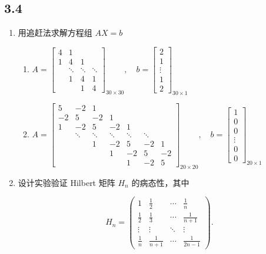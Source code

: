 \subsection*{3.4}
\begin{enumerate}
    \item 用追赶法求解方程组 $AX = b$
    \begin{enumerate}
        \item $A = \begin{bmatrix}
4 & 1 \\
1 & 4 & 1 \\
&\ddots & \ddots & \ddots \\
&1 & 4 & 1 \\
& &1 & 4 
\end{bmatrix}_{30 \times 30}, \quad 
b = \begin{bmatrix}
2 \\
1 \\
\vdots \\
1 \\
2
\end{bmatrix}_{30 \times 1}$
        \item $A = \begin{bmatrix} 5 & -2 & 1 \\ -2 & 5 & -2 & 1 \\ 1 & -2 & 5 & -2 & 1 \\
& \ddots & \ddots & \ddots & \ddots & \ddots \\
& &1 & -2 & 5 & -2 & 1 \\
& & &1 & -2 & 5 & -2 \\
&&&&1 &-2 &5
\end{bmatrix}_{20 \times 20}, \quad b = \begin{bmatrix} 1 \\ 0 \\ 0 \\ \vdots \\ 0 \\ 0 \end{bmatrix}_{20 \times 1}$
    \end{enumerate}
    \item 设计实验验证 Hilbert 矩阵 $H_n$ 的病态性，其中

\[ H_n = \begin{pmatrix}
1 & \frac{1}{2} & \cdots & \frac{1}{n} \\
\frac{1}{2} & \frac{1}{3} & \cdots & \frac{1}{n+1} \\
\vdots & \vdots & \ddots & \vdots \\
\frac{1}{n} & \frac{1}{n+1} & \cdots & \frac{1}{2n-1}
\end{pmatrix}.
\]
\end{enumerate}


